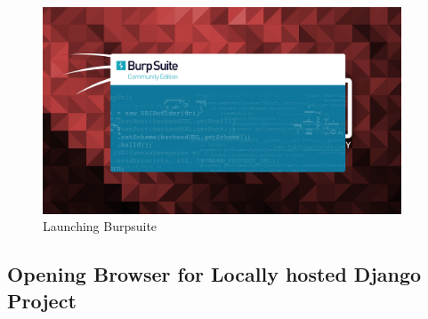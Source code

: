 \documentclass[11pt]{article}
\begin{document}
\begin{figure}[H]
    \centering
    \includegraphics[width=0.95\textwidth]{burpsuite (1).png}
    \caption{Launching Burpsuite}
    \label{fig:1}
\end{figure}
\subsection{Opening Browser for Locally hosted Django Project}



\end{document}

